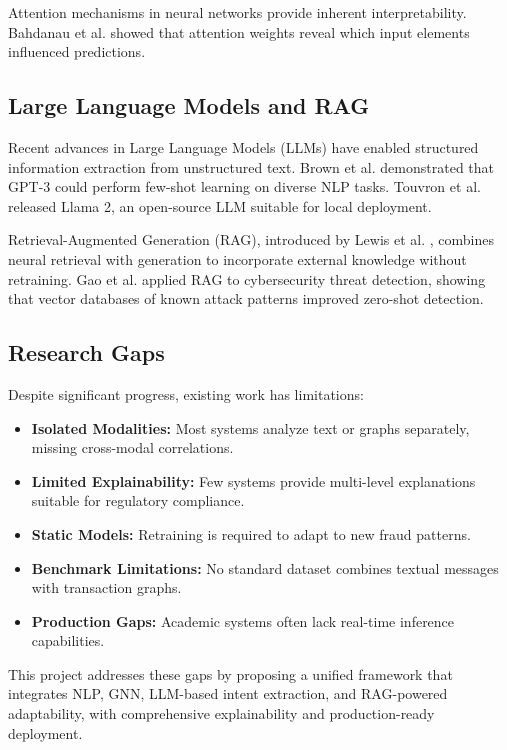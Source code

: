 Attention mechanisms in neural networks provide inherent interpretability. Bahdanau et al. \cite{bahdanau2015neural} showed that attention weights reveal which input elements influenced predictions.

\subsection{Large Language Models and RAG}

Recent advances in Large Language Models (LLMs) have enabled structured information extraction from unstructured text. Brown et al. \cite{brown2020language} demonstrated that GPT-3 could perform few-shot learning on diverse NLP tasks. Touvron et al. \cite{touvron2023llama} released Llama 2, an open-source LLM suitable for local deployment.

Retrieval-Augmented Generation (RAG), introduced by Lewis et al. \cite{lewis2020retrieval}, combines neural retrieval with generation to incorporate external knowledge without retraining. Gao et al. \cite{gao2023retrieval} applied RAG to cybersecurity threat detection, showing that vector databases of known attack patterns improved zero-shot detection.

\subsection{Research Gaps}

Despite significant progress, existing work has limitations:

\begin{itemize}
    \item \textbf{Isolated Modalities:} Most systems analyze text or graphs separately, missing cross-modal correlations.
    \item \textbf{Limited Explainability:} Few systems provide multi-level explanations suitable for regulatory compliance.
    \item \textbf{Static Models:} Retraining is required to adapt to new fraud patterns.
    \item \textbf{Benchmark Limitations:} No standard dataset combines textual messages with transaction graphs.
    \item \textbf{Production Gaps:} Academic systems often lack real-time inference capabilities.
\end{itemize}

This project addresses these gaps by proposing a unified framework that integrates NLP, GNN, LLM-based intent extraction, and RAG-powered adaptability, with comprehensive explainability and production-ready deployment.

